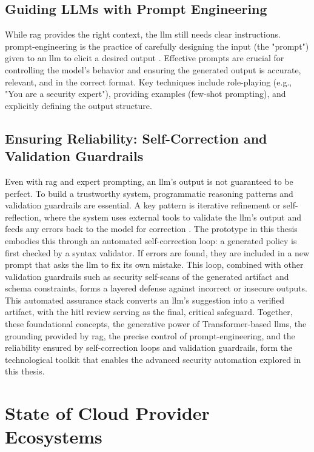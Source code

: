 \subsection{Guiding LLMs with Prompt Engineering}
While \gls{rag} provides the right context, the \gls{llm} still needs clear instructions. \gls{prompt-engineering} is the practice of carefully designing the input (the "prompt") given to an \gls{llm} to elicit a desired output \cite{sahoo_systematic_2024}. Effective prompts are crucial for controlling the model's behavior and ensuring the generated output is accurate, relevant, and in the correct format. Key techniques include role-playing (e.g., "You are a security expert"), providing examples (few-shot prompting), and explicitly defining the output structure.

\subsection{Ensuring Reliability: Self-Correction and Validation Guardrails}
Even with \gls{rag} and expert prompting, an \gls{llm}'s output is not guaranteed to be perfect. To build a trustworthy system, programmatic reasoning patterns and validation guardrails are essential. A key pattern is iterative refinement or self-reflection, where the system uses external tools to validate the \gls{llm}'s output and feeds any errors back to the model for correction \cite{vaswani_attention_2023}. The prototype in this thesis embodies this through an automated self-correction loop: a generated policy is first checked by a syntax validator. If errors are found, they are included in a new prompt that asks the \gls{llm} to fix its own mistake. This loop, combined with other validation guardrails such as security self-scans of the generated artifact and schema constraints, forms a layered defense against incorrect or insecure outputs. This automated assurance stack converts an \gls{llm}'s suggestion into a verified artifact, with the \gls{hitl} review serving as the final, critical safeguard.
Together, these foundational concepts, the generative power of Transformer-based \glspl{llm}, the grounding provided by \gls{rag}, the precise control of \gls{prompt-engineering}, and the reliability ensured by self-correction loops and validation guardrails, form the technological toolkit that enables the advanced security automation explored in this thesis.

\section{State of Cloud Provider Ecosystems}
\label{sec:cloud_ecosystems}


